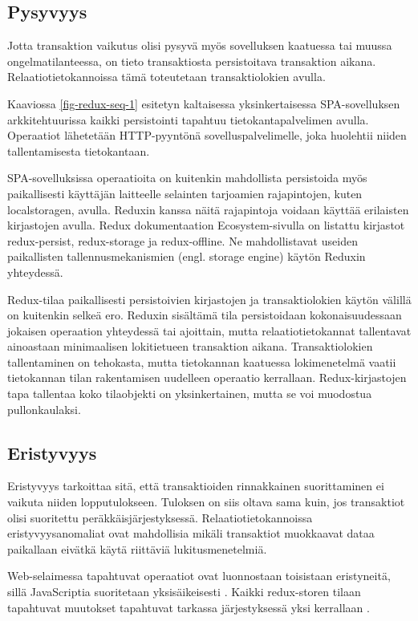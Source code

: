 \documentclass[finnish,twoside,censored,csm,sw-track-2018]{HYthesisML}
\begin{document}
\subsection{Pysyvyys}

Jotta transaktion vaikutus olisi pysyvä myös sovelluksen kaatuessa tai muussa ongelmatilanteessa, on tieto transaktiosta persistoitava transaktion aikana. Relaatiotietokannoissa tämä toteutetaan transaktiolokien avulla.

Kaaviossa \ref{fig-redux-seq-1} esitetyn kaltaisessa yksinkertaisessa SPA-sovelluksen arkkitehtuurissa kaikki persistointi tapahtuu tietokantapalvelimen avulla. Operaatiot lähetetään HTTP-pyyntönä sovelluspalvelimelle, joka huolehtii niiden tallentamisesta tietokantaan.

SPA-sovelluksissa operaatioita on kuitenkin mahdollista persistoida myös paikallisesti käyttäjän laitteelle selainten tarjoamien rajapintojen, kuten localstoragen, avulla. Reduxin kanssa näitä rajapintoja voidaan käyttää erilaisten kirjastojen avulla. Redux dokumentaation Ecosystem-sivulla \citep{redux-ecosystem} on listattu kirjastot redux-persist, redux-storage ja redux-offline. Ne mahdollistavat useiden paikallisten tallennusmekanismien (engl. storage engine) käytön Reduxin yhteydessä. 

Redux-tilaa paikallisesti persistoivien kirjastojen ja transaktiolokien käytön välillä on kuitenkin selkeä ero. Reduxin sisältämä tila persistoidaan kokonaisuudessaan jokaisen operaation yhteydessä tai ajoittain, mutta relaatiotietokannat tallentavat ainoastaan minimaalisen lokitietueen transaktion aikana. Transaktiolokien tallentaminen on tehokasta, mutta tietokannan kaatuessa lokimenetelmä vaatii tietokannan tilan rakentamisen uudelleen operaatio kerrallaan. Redux-kirjastojen tapa tallentaa koko tilaobjekti on yksinkertainen, mutta se voi muodostua pullonkaulaksi.

\subsection{Eristyvyys}

Eristyvyys tarkoittaa sitä, että transaktioiden rinnakkainen suorittaminen ei vaikuta niiden lopputulokseen. Tuloksen on siis oltava sama kuin, jos transaktiot olisi suoritettu peräkkäisjärjestyksessä. Relaatiotietokannoissa eristyvyysanomaliat ovat mahdollisia mikäli transaktiot muokkaavat dataa paikallaan eivätkä käytä riittäviä lukitusmenetelmiä.

Web-selaimessa tapahtuvat operaatiot ovat luonnostaan toisistaan eristyneitä, sillä JavaScriptia suoritetaan yksisäikeisesti \citep{JSdefguide}. Kaikki redux-storen tilaan tapahtuvat muutokset tapahtuvat tarkassa järjestyksessä yksi kerrallaan \cite{redux-principles}.
\end{document}
